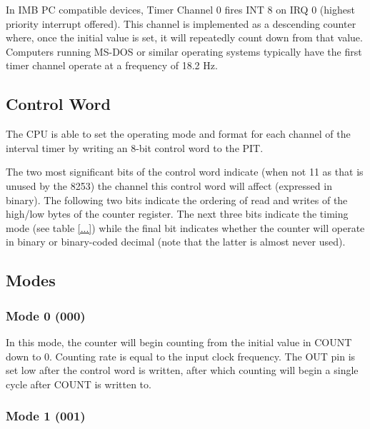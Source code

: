 	In IMB PC compatible devices, Timer Channel 0 fires INT 8 on IRQ 0 (highest priority interrupt offered). This channel is implemented as a descending counter where, once the initial value is set, it will repeatedly count down from that value. Computers running MS-DOS or similar operating systems typically have the first timer channel operate at a frequency of 18.2 Hz.

	\subsection{Control Word}
		The CPU is able to set the operating mode and format for each channel of the interval timer by writing an 8-bit control word to the PIT.

		The two most significant bits of the control word indicate (when not 11 as that is unused by the 8253) the channel this control word will affect (expressed in binary). The following two bits indicate the ordering of read and writes of the high/low bytes of the counter register. The next three bits indicate the timing mode (see table \ref{...}) while the final bit indicates whether the counter will operate in binary or binary-coded decimal (note that the latter is almost never used).

	\subsection{Modes}
		\subsubsection{Mode 0 (000)}
			In this mode, the counter will begin counting from the initial value in COUNT down to 0. Counting rate is equal to the input clock frequency. The OUT pin is set low after the control word is written, after which counting will begin a single cycle after COUNT is written to.

		\subsubsection{Mode 1 (001)}